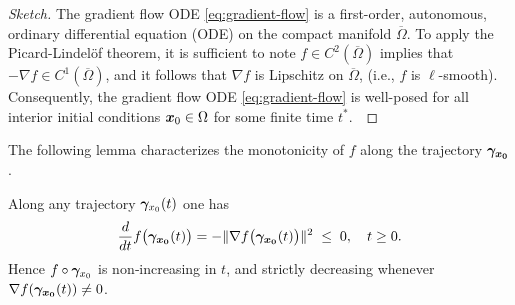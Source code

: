 \documentclass[10pt]{article}
\begin{document}
        \begin{proof}[Sketch]
            The gradient flow ODE \eqref{eq:gradient-flow} is a first-order, autonomous,
            ordinary differential equation (ODE) on the compact manifold $\overline{\Omega}$.
            To apply the Picard-Lindelöf theorem, it is sufficient to note $f \in C^{2}(\overline{\Omega})$
            implies that $-\nabla f \in C^{1}(\overline{\Omega})$, and it follows that $\nabla f$ is
            Lipschitz on $\overline{\Omega}$, (i.e., $f$ is $\ell$-smooth). Consequently, the gradient 
            flow ODE \eqref{eq:gradient-flow} is well-posed for all interior initial conditions 
            $\bm{x}_0 \in \Omega$ for some finite time $t^*$.\

        \end{proof}

        The following lemma characterizes the monotonicity of $f$ along the trajectory $\bm{\gamma}_{\bm{x_0}}$.

        \begin{lemma}\label{lem:monotone-flow-lines}
            Along any trajectory $\bm{\gamma}_{x_0}(t)$ one has
            \begin{equation}\label{eq:monotone-flow-lines}
                \frac{d}{dt}f\bigl(\bm{\gamma}_{\bm{x_0}}(t)\bigr) = -\|\nabla f\bigl(\bm{\gamma}_{\bm{x_0}}(t)\bigr)\|^{2}\;\le\;0, \quad t \ge 0.
            \end{equation}
            Hence $f\circ\bm{\gamma}_{x_0}$ is non‐increasing in $t$, and strictly decreasing whenever $\nabla f(\bm{\gamma}_{\bm{x_0}}(t))\neq0$.
        \end{lemma}
\end{document}
